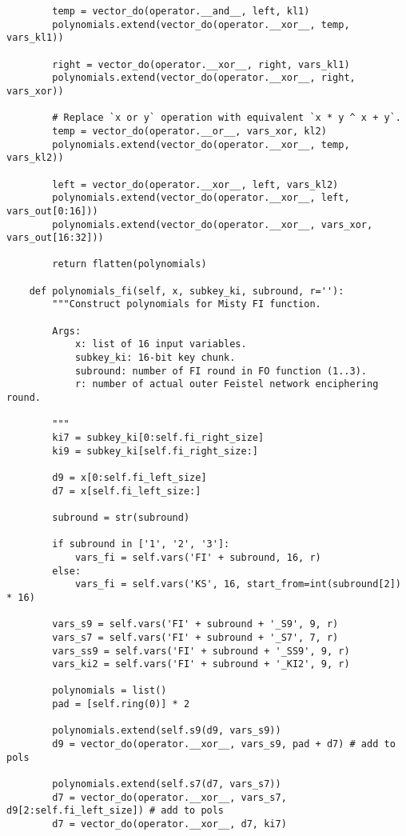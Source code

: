 \begin{lstlisting}
        temp = vector_do(operator.__and__, left, kl1)
        polynomials.extend(vector_do(operator.__xor__, temp, vars_kl1))

        right = vector_do(operator.__xor__, right, vars_kl1)
        polynomials.extend(vector_do(operator.__xor__, right, vars_xor))

        # Replace `x or y` operation with equivalent `x * y ^ x + y`.
        temp = vector_do(operator.__or__, vars_xor, kl2)
        polynomials.extend(vector_do(operator.__xor__, temp, vars_kl2))

        left = vector_do(operator.__xor__, left, vars_kl2)
        polynomials.extend(vector_do(operator.__xor__, left, vars_out[0:16]))
        polynomials.extend(vector_do(operator.__xor__, vars_xor, vars_out[16:32]))

        return flatten(polynomials)

    def polynomials_fi(self, x, subkey_ki, subround, r=''):
        """Construct polynomials for Misty FI function.

        Args:
            x: list of 16 input variables.
            subkey_ki: 16-bit key chunk.
            subround: number of FI round in FO function (1..3).
            r: number of actual outer Feistel network enciphering round.

        """
        ki7 = subkey_ki[0:self.fi_right_size]
        ki9 = subkey_ki[self.fi_right_size:]

        d9 = x[0:self.fi_left_size]
        d7 = x[self.fi_left_size:]

        subround = str(subround)

        if subround in ['1', '2', '3']:
            vars_fi = self.vars('FI' + subround, 16, r)
        else:
            vars_fi = self.vars('KS', 16, start_from=int(subround[2]) * 16)

        vars_s9 = self.vars('FI' + subround + '_S9', 9, r)
        vars_s7 = self.vars('FI' + subround + '_S7', 7, r)
        vars_ss9 = self.vars('FI' + subround + '_SS9', 9, r)
        vars_ki2 = self.vars('FI' + subround + '_KI2', 9, r)

        polynomials = list()
        pad = [self.ring(0)] * 2

        polynomials.extend(self.s9(d9, vars_s9))
        d9 = vector_do(operator.__xor__, vars_s9, pad + d7) # add to pols

        polynomials.extend(self.s7(d7, vars_s7))
        d7 = vector_do(operator.__xor__, vars_s7, d9[2:self.fi_left_size]) # add to pols
        d7 = vector_do(operator.__xor__, d7, ki7)


\end{lstlisting}
